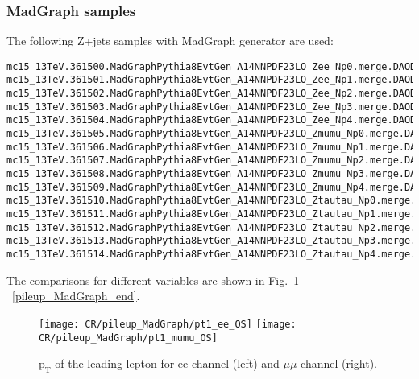 \subsubsection{MadGraph samples}
The following Z+jets samples with MadGraph generator are used:
\scriptsize
\begin{verbatim}
mc15_13TeV.361500.MadGraphPythia8EvtGen_A14NNPDF23LO_Zee_Np0.merge.DAOD_SUSY2.e3898_s2608_s2183_r6869_r6282_p2419/
mc15_13TeV.361501.MadGraphPythia8EvtGen_A14NNPDF23LO_Zee_Np1.merge.DAOD_SUSY2.e3898_s2608_s2183_r6869_r6282_p2419/
mc15_13TeV.361502.MadGraphPythia8EvtGen_A14NNPDF23LO_Zee_Np2.merge.DAOD_SUSY2.e3898_s2608_s2183_r6869_r6282_p2419/
mc15_13TeV.361503.MadGraphPythia8EvtGen_A14NNPDF23LO_Zee_Np3.merge.DAOD_SUSY2.e3898_s2608_s2183_r6869_r6282_p2419/
mc15_13TeV.361504.MadGraphPythia8EvtGen_A14NNPDF23LO_Zee_Np4.merge.DAOD_SUSY2.e3898_s2608_s2183_r6869_r6282_p2419/
mc15_13TeV.361505.MadGraphPythia8EvtGen_A14NNPDF23LO_Zmumu_Np0.merge.DAOD_SUSY2.e3898_s2608_s2183_r6869_r6282_p2419/
mc15_13TeV.361506.MadGraphPythia8EvtGen_A14NNPDF23LO_Zmumu_Np1.merge.DAOD_SUSY2.e3898_s2608_s2183_r6869_r6282_p2419/
mc15_13TeV.361507.MadGraphPythia8EvtGen_A14NNPDF23LO_Zmumu_Np2.merge.DAOD_SUSY2.e3898_s2608_s2183_r6869_r6282_p2419/
mc15_13TeV.361508.MadGraphPythia8EvtGen_A14NNPDF23LO_Zmumu_Np3.merge.DAOD_SUSY2.e3898_s2608_s2183_r6869_r6282_p2419/
mc15_13TeV.361509.MadGraphPythia8EvtGen_A14NNPDF23LO_Zmumu_Np4.merge.DAOD_SUSY2.e3898_s2608_s2183_r6869_r6282_p2419/
mc15_13TeV.361510.MadGraphPythia8EvtGen_A14NNPDF23LO_Ztautau_Np0.merge.DAOD_SUSY2.e3898_s2608_s2183_r6869_r6282_p2419/
mc15_13TeV.361511.MadGraphPythia8EvtGen_A14NNPDF23LO_Ztautau_Np1.merge.DAOD_SUSY2.e3898_s2608_s2183_r6869_r6282_p2419/
mc15_13TeV.361512.MadGraphPythia8EvtGen_A14NNPDF23LO_Ztautau_Np2.merge.DAOD_SUSY2.e3898_s2608_s2183_r6869_r6282_p2419/
mc15_13TeV.361513.MadGraphPythia8EvtGen_A14NNPDF23LO_Ztautau_Np3.merge.DAOD_SUSY2.e3898_s2608_s2183_r6869_r6282_p2419/
mc15_13TeV.361514.MadGraphPythia8EvtGen_A14NNPDF23LO_Ztautau_Np4.merge.DAOD_SUSY2.e3898_s2608_s2183_r6869_r6282_p2419/
\end{verbatim}
\normalsize

The comparisons for different variables are shown in Fig.~\ref{pileup_MadGraph_start}~-~\ref{pileup_MadGraph_end}.

\begin{figure}
\texttt{[image: CR/pileup\_MadGraph/pt1\_ee\_OS]}
\texttt{[image: CR/pileup\_MadGraph/pt1\_mumu\_OS]}
\caption{$\text{p}_{\text{T}}$ of the leading lepton for ee channel (left) and $\mu\mu$ channel (right).}
\label{pileup_MadGraph_start}
\end{figure}

